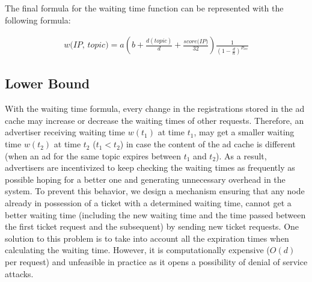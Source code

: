 The final formula for the waiting time function can be represented with the following formula:%

\begin{equation}
\begin{split}
    \textit{w(IP, topic)} = 
    a(b + \frac{d(topic)}{d} + \frac{\textit{score(IP)}}{32}
    )
    \frac{1}{(1-\frac{d}{n})^{P_\textit{occ}}}
\end{split}
\end{equation}



\subsection{Lower Bound}
With the waiting time formula, every change in the registrations stored in the ad cache may increase or decrease the waiting times of other requests. 
Therefore, an advertiser receiving waiting time $w(t_1)$ at time $t_1$, may get a smaller waiting time $w(t_2)$ at time $t_2$ ($t_1 < t_2$) in case the content of the ad cache is different (\eg when an ad for the same topic expires between $t_1$ and $t_2$). 
As a result, advertisers are incentivized to keep checking the waiting times as frequently as possible hoping for a better one and generating unnecessary overhead in the system.
To prevent this behavior, we design a mechanism ensuring that any node already in possession of a ticket with a determined waiting time, cannot get a better waiting time (including the new waiting time and the time passed between the first ticket request and the subsequent) by sending new ticket requests.
One solution to this problem is to take into account all the expiration times when calculating the waiting time. 
However, it is computationally expensive (\eg $O(d)$ per request) and unfeasible in practice as it opens a possibility of denial of service attacks.


